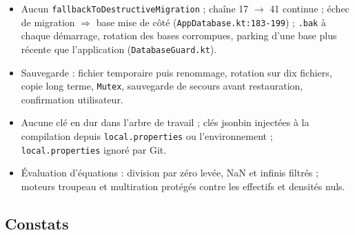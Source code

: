 \documentclass[11pt,a4paper]{article}
\newcommand{\fichier}[1]{\texttt{\small #1}}
\newcommand{\code}[1]{\texttt{#1}}
\begin{document}
\begin{itemize}
\item Aucun \code{fallbackToDestructiveMigration} ; chaîne 17 $\rightarrow$ 41 continue ; échec
  de migration $\Rightarrow$ base mise de côté (\fichier{AppDatabase.kt:183-199}) ; \code{.bak} à
  chaque démarrage, rotation des bases corrompues, parking d'une base plus récente que
  l'application (\fichier{DatabaseGuard.kt}).
\item Sauvegarde : fichier temporaire puis renommage, rotation sur dix fichiers, copie long terme,
  \code{Mutex}, sauvegarde de secours avant restauration, confirmation utilisateur.
\item Aucune clé en dur dans l'arbre de travail ; clés jsonbin injectées à la compilation depuis
  \fichier{local.properties} ou l'environnement ; \fichier{local.properties} ignoré par Git.
\item Évaluation d'équations : division par zéro levée, NaN et infinis filtrés ; moteurs troupeau
  et multiration protégés contre les effectifs et densités nuls.
\end{itemize}

\subsection*{Constats}
\end{document}
